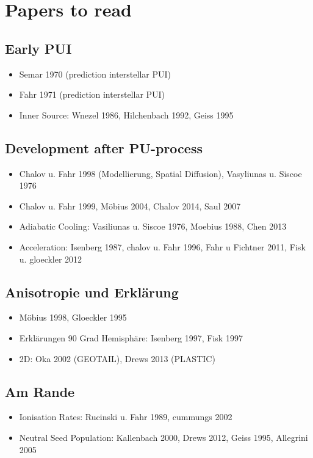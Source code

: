 \documentclass[]{article}
\begin{document}
\section{Papers to read}
%
\subsection{Early PUI}
\begin{itemize}
	\item Semar 1970 (prediction interstellar PUI)
	\item Fahr 1971 (prediction interstellar PUI)
	\item Inner Source: Wnezel 1986, Hilchenbach 1992, Geiss 1995
\end{itemize}
%
\subsection{Development after PU-process}
\begin{itemize}
	\item Chalov u. Fahr 1998 (Modellierung, Spatial Diffusion), Vasyliunas u. Siscoe 1976
	\item Chalov u. Fahr 1999, Möbius 2004, Chalov 2014, Saul 2007
	\item Adiabatic Cooling: Vasiliunas u. Siscoe 1976, Moebius 1988, Chen 2013
	\item Acceleration: Isenberg 1987, chalov u. Fahr 1996, Fahr u Fichtner 2011, Fisk u. gloeckler 2012
\end{itemize}
%
\subsection{Anisotropie und Erklärung}
\begin{itemize}
	\item Möbius 1998, Gloeckler 1995
	\item Erklärungen 90 Grad Hemisphäre: Isenberg 1997, Fisk 1997
	\item 2D: Oka 2002 (GEOTAIL), Drews 2013 (PLASTIC)
\end{itemize}
%
%
%
\subsection{Am Rande}
\begin{itemize}
	\item Ionisation Rates: Rucinski u. Fahr 1989, cummungs 2002
	\item Neutral Seed Population: Kallenbach 2000, Drews 2012, Geiss 1995, Allegrini 2005
\end{itemize}
\newpage
\printbibliography[heading=bibintoc]
\end{document}
